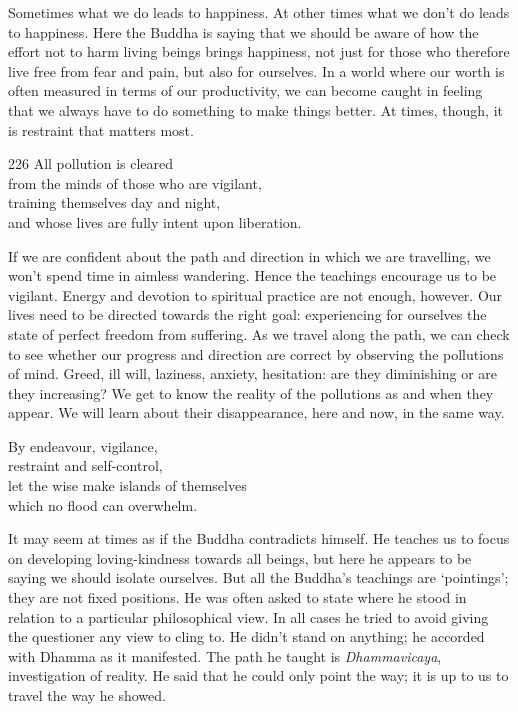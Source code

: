 \begin{dhpRefl}
  Sometimes what we do leads to happiness. At other times what we don’t do leads
  to happiness. Here the Buddha is saying that we should be aware of how the
  effort not to harm living beings brings happiness, not just for those who
  therefore live free from fear and pain, but also for ourselves. In a world
  where our worth is often measured in terms of our productivity, we can become
  caught in feeling that we always have to do something to make things better.
  At times, though, it is restraint that matters most.
\end{dhpRefl}


\begin{dhpVerse}{226}
\label{dhp-226}
All pollution is cleared\\
from the minds of those who are vigilant,\\
training themselves day and night,\\
and whose lives are fully intent upon liberation.
\end{dhpVerse}

\begin{dhpRefl}
  If we are confident about the path and direction in which we are travelling,
  we won’t spend time in aimless wandering. Hence the teachings encourage us to
  be vigilant. Energy and devotion to spiritual practice are not enough,
  however. Our lives need to be directed towards the right goal: experiencing
  for ourselves the state of perfect freedom from suffering. As we travel along
  the path, we can check to see whether our progress and direction are correct
  by observing the pollutions of mind. Greed, ill will, laziness, anxiety,
  hesitation: are they diminishing or are they increasing? We get to know the
  reality of the pollutions as and when they appear. We will learn about their
  disappearance, here and now, in the same way.
\end{dhpRefl}


\begin{dhpVerse}{25}
\label{dhp-25}
By endeavour, vigilance,\\
restraint and self-control,\\
let the wise make islands of themselves\\
which no flood can overwhelm.
\end{dhpVerse}

\begin{dhpRefl}
  It may seem at times as if the Buddha contradicts himself. He teaches us to
  focus on developing loving-kindness towards all beings, but here he appears to
  be saying we should isolate ourselves. But all the Buddha’s teachings are
  ‘pointings’; they are not fixed positions. He was often asked to state where
  he stood in relation to a particular philosophical view. In all cases he tried
  to avoid giving the questioner any view to cling to. He didn’t stand on
  anything; he accorded with Dhamma as it manifested. The path he taught is
  \emph{Dhammavicaya}, investigation of reality. He said that he could only
  point the way; it is up to us to travel the way he showed.
\end{dhpRefl}

